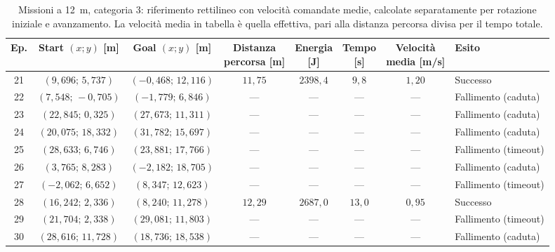 \begin{table}[H]
\centering
\caption{Missioni a 12~m, categoria 3: riferimento rettilineo con velocità comandate medie, calcolate separatamente per rotazione iniziale e avanzamento. La velocità media in tabella è quella effettiva, pari alla distanza percorsa divisa per il tempo totale.}
\label{tab:straight-line-command-mean-12m-cat3}
\begingroup
\fontsize{9}{11}\selectfont
\setlength{\tabcolsep}{2.5pt}
\renewcommand{\arraystretch}{1.2}
\begin{tabular}{@{}c cc cccc l@{}}
\toprule
Ep. & \shortstack{Start $(x;y)$\\{}[m]} & \shortstack{Goal $(x;y)$\\{}[m]} & \shortstack{Distanza\\percorsa [m]} & \shortstack{Energia\\{}[J]} & \shortstack{Tempo\\{}[s]} & \shortstack{Velocità\\media [m/s]} & Esito \\
\midrule
21 & $(9{,}696;\,5{,}737)$ & $(-0{,}468;\,12{,}116)$ & $11{,}75$ & $2398{,}4$ & $9{,}8$ & $1{,}20$ & Successo \\
22 & $(7{,}548;\,-0{,}705)$ & $(-1{,}779;\,6{,}846)$ & --- & --- & --- & --- & Fallimento (caduta) \\
23 & $(22{,}845;\,0{,}325)$ & $(27{,}673;\,11{,}311)$ & --- & --- & --- & --- & Fallimento (caduta) \\
24 & $(20{,}075;\,18{,}332)$ & $(31{,}782;\,15{,}697)$ & --- & --- & --- & --- & Fallimento (caduta) \\
25 & $(28{,}633;\,6{,}746)$ & $(23{,}881;\,17{,}766)$ & --- & --- & --- & --- & Fallimento (timeout) \\
26 & $(3{,}765;\,8{,}283)$ & $(-2{,}182;\,18{,}705)$ & --- & --- & --- & --- & Fallimento (caduta) \\
27 & $(-2{,}062;\,6{,}652)$ & $(8{,}347;\,12{,}623)$ & --- & --- & --- & --- & Fallimento (timeout) \\
28 & $(16{,}242;\,2{,}336)$ & $(8{,}240;\,11{,}278)$ & $12{,}29$ & $2687{,}0$ & $13{,}0$ & $0{,}95$ & Successo \\
29 & $(21{,}704;\,2{,}338)$ & $(29{,}081;\,11{,}803)$ & --- & --- & --- & --- & Fallimento (timeout) \\
30 & $(28{,}616;\,11{,}728)$ & $(18{,}736;\,18{,}538)$ & --- & --- & --- & --- & Fallimento (caduta) \\
\bottomrule
\end{tabular}
\endgroup
\end{table}

